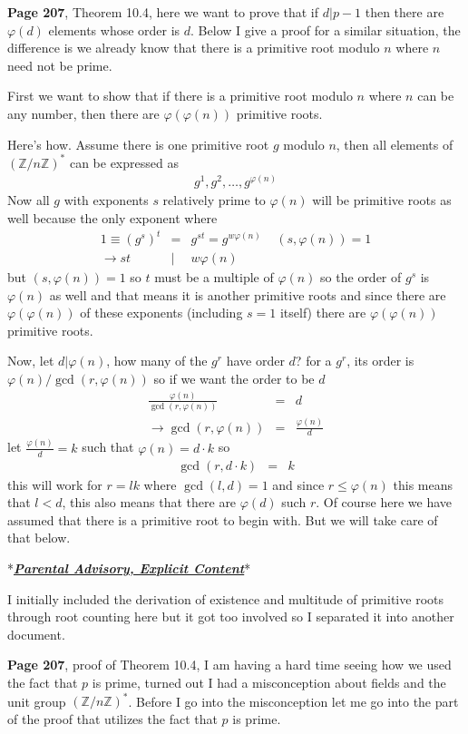 \documentclass[aps,preprint,preprintnumbers,nofootinbib,showpacs,prd]{revtex4-1}
\newcommand{\nbea}{\begin{eqnarray*}}
\newcommand{\neea}{\end{eqnarray*}}
\begin{document}
{\bf Page 207}, Theorem 10.4, here we want to prove that if $d|p-1$ then there are $\varphi(d)$ elements whose order is $d$. Below I give a proof for a similar situation, the difference is we already know that there is a primitive root modulo $n$ where $n$ need not be prime.

First we want to show that if there is a primitive root modulo $n$ where $n$ can be any number, then there are $\varphi(\varphi(n))$ primitive roots.

Here's how. Assume there is one primitive root $g$ modulo $n$, then all elements of $(\mathbb{Z}/n\mathbb{Z})^*$ can be expressed as
%
\nbea
g^1, g^2 ,\dots, g^{\varphi(n)}
\neea
%
Now all $g$ with exponents $s$ relatively prime to $\varphi(n)$ will be primitive roots as well because the only exponent where
%
\nbea
1 \equiv (g^s)^t & = & g^{st} = g^{w\varphi(n)} ~~~~~ (s,\varphi(n)) = 1 \\
\to st &|& w\varphi(n)
\neea
%
but $(s,\varphi(n)) = 1$ so $t$ must be a multiple of $\varphi(n)$ so the order of $g^s$ is $\varphi(n)$ as well and that means it is another primitive roots and since there are $\varphi(\varphi(n))$ of these exponents (including $s=1$ itself) there are $\varphi(\varphi(n))$ primitive roots.

Now, let $d|\varphi(n)$, how many of the $g^r$ have order $d$? for a $g^r$, its order is $\varphi(n)/\gcd(r,\varphi(n))$ so if we want the order to be $d$
%
\nbea
\frac{\varphi(n)}{\gcd(r,\varphi(n))} & = & d \\
\to \gcd(r,\varphi(n)) & = & \frac{\varphi(n)}{d}
\neea
%
let $\frac{\varphi(n)}{d} = k$ such that $\varphi(n) = d\cdot k$ so
%
\nbea
\gcd(r,d\cdot k) & = & k
\neea
%
this will work for $r = lk$ where $\gcd(l,d) = 1$ and since $r \le \varphi(n)$ this means that $l < d$, this also means that there are $\varphi(d)$ such $r$. Of course here we have assumed that there is a primitive root to begin with. But we will take care of that below.

*\hspace{0.5mm}\underline{\textit{\textbf {Parental Advisory, Explicit Content}}}\hspace{0.7mm}*

I initially included the derivation of existence and multitude of primitive roots through root counting here but it got too involved so I separated it into another document.

{\bf Page 207}, proof of Theorem 10.4, I am having a hard time seeing how we used the fact that $p$ is prime, turned out I had a misconception about fields and the unit group $(\mathbb{Z}/n\mathbb{Z})^*$. Before I go into the misconception let me go into the part of the proof that utilizes the fact that $p$ is prime.
\end{document}
